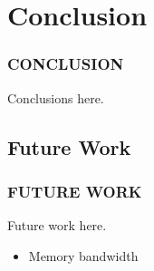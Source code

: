 
\section{Conclusion}
\begin{frame}
\frametitle{CONCLUSION}

Conclusions here.

\end{frame}

\subsection{Future Work}
\begin{frame}
\frametitle{FUTURE WORK}

Future work here.

\begin{itemize}
\item Memory bandwidth
\end{itemize}

\end{frame}

